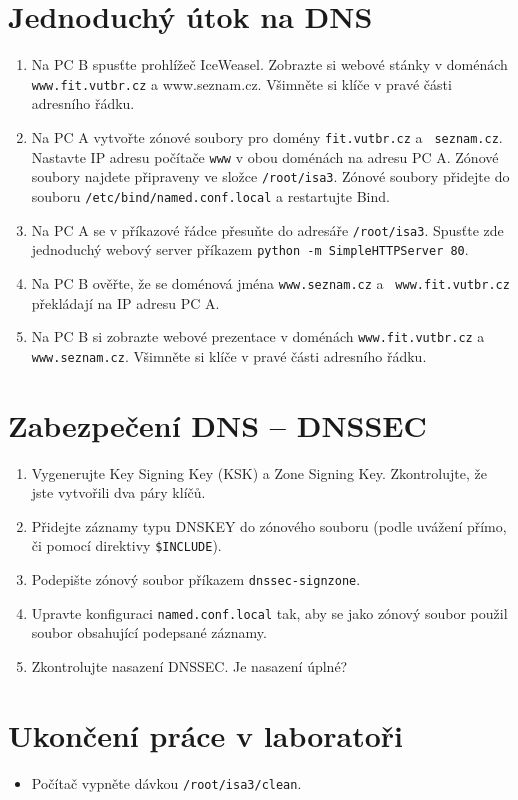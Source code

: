 \begin{enumerate}
\end{enumerate}

\section{Jednoduchý útok na DNS}

\begin{enumerate}
  \item Na PC B spusťte prohlížeč IceWeasel. Zobrazte si webové stánky v
    doménách {\tt www.fit.vutbr.cz} a {www.seznam.cz}. Všimněte si klíče v pravé
    části adresního řádku.

  \item Na PC A vytvořte zónové soubory pro domény {\tt fit.vutbr.cz} a {\tt
    seznam.cz}. Nastavte IP adresu počítače {\tt www} v obou doménách na adresu
    PC A. Zónové soubory najdete připraveny ve složce {\tt /root/isa3}. Zónové
    soubory přidejte do souboru {\tt /etc/bind/named.conf.local} a restartujte
    Bind.

  \item Na PC A se v příkazové řádce přesuňte do adresáře {\tt /root/isa3}.
    Spusťte zde jednoduchý webový server příkazem {\tt python -m
    SimpleHTTPServer 80}.

  \item Na PC B ověřte, že se doménová jména {\tt www.seznam.cz} a {\tt
    www.fit.vutbr.cz} překládají na IP adresu PC A.

  \item Na PC B si zobrazte webové prezentace v doménách {\tt www.fit.vutbr.cz}
    a {\tt www.seznam.cz}. Všimněte si klíče v pravé části adresního řádku.

\end{enumerate}

\section{Zabezpečení DNS -- DNSSEC}

\begin{enumerate}

  \item Vygenerujte Key Signing Key (KSK) a Zone Signing Key. Zkontrolujte, že
    jste vytvořili dva páry klíčů.

  \item Přidejte záznamy typu DNSKEY do zónového souboru (podle uvážení přímo,
    či pomocí direktivy \verb|$INCLUDE|).

  \item Podepište zónový soubor příkazem \verb|dnssec-signzone|.

  \item Upravte konfiguraci {\tt named.conf.local} tak, aby se jako zónový
    soubor použil soubor obsahující podepsané záznamy.

  \item Zkontrolujte nasazení DNSSEC. Je nasazení úplné?

\end{enumerate}


\section{Ukončení práce v laboratoři}
\begin{itemize}
  \item Počítač vypněte dávkou {\tt /root/isa3/clean}.
\end{itemize}
